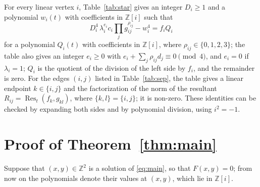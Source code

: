 \documentclass[11pt]{article}
\newcommand{\Z}{\mathbb{Z}}
\begin{document}
For every linear vertex $i$, Table~\ref{tab:star} gives an integer $D_i\geq1$ and a polynomial $w_i(t)$ with coefficients in $\Z[i]$ such that
\begin{equation}\label{eq:starlin}
D_i^4\,\lambda_i^{e_i}c_i\prod_jg_{ij}^{\rho_{ij}}-w_i^4=f_iQ_i
\end{equation}
for a polynomial $Q_i(t)$ with coefficients in $\Z[i]$, where $\rho_{ij}\in\{0,1,2,3\}$; the table also gives an integer $e_i\geq0$ with $e_i+\sum_j\rho_{ij}d_j\equiv0\pmod4$, and $e_i=0$ if $\lambda_i=1$; $Q_i$ is the quotient of the division of the left side by $f_i$, and the remainder is zero.
For the edges $(i,j)$ listed in Table~\ref{tab:sep}, the table gives a linear endpoint $k\in\{i,j\}$ and the factorization of the norm of the resultant $R_{ij}=\operatorname{Res}_t(f_k,g_{kl})$, where $\{k,l\}=\{i,j\}$; it is non-zero.
These identities can be checked by expanding both sides and by polynomial division, using $i^2=-1$.

\section{Proof of Theorem~\ref{thm:main}}

Suppose that $(x,y)\in\Z^2$ is a solution of \eqref{eq:main}, so that $F(x,y)=0$; from now on the polynomials denote their values at $(x,y)$, which lie in $\Z[i]$.
\end{document}
